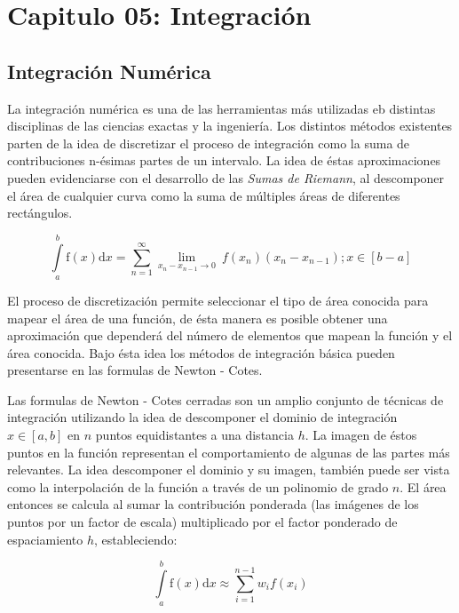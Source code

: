 \documentclass[letterpaper,10pt,oneside]{sphinxmanual}
\theoremstyle{plain}%
\theoremstyle{definition}%
\theoremstyle{remark}%
\begin{document}
\chapter{Capitulo 05: Integración}
\label{chapter05::doc}\label{chapter05:capitulo-05-integración}

\section{Integración Numérica}
\label{chapter05:Integración Numérica}
La integración numérica es una de las herramientas más utilizadas eb distintas disciplinas de las ciencias exactas y la ingeniería. Los distintos métodos existentes parten de la idea de discretizar el proceso de integración como la suma de contribuciones n-ésimas partes de un intervalo. La idea de éstas aproximaciones pueden evidenciarse con el desarrollo de las \textit{Sumas de Riemann}, al descomponer el área de cualquier curva como la suma de múltiples áreas de diferentes rectángulos.

\begin{equation}
\int\limits_{a}^{b} \mathrm{f}(x)\mathrm{d}x = \sum\limits_{n=1}^{\infty} \lim_{x_{n} - x_{n-1}\to 0}\ f(x_{n})(x_{n} - x_{n-1}); x\in[b - a]
\end{equation}

El proceso de discretización permite seleccionar el tipo de área conocida para mapear el área de una función, de ésta manera es posible obtener una aproximación que dependerá del número de elementos que mapean la función y el área conocida. Bajo ésta idea los métodos de integración básica pueden presentarse en las formulas de Newton - Cotes.

Las formulas de Newton - Cotes cerradas son un amplio conjunto de técnicas de integración utilizando la idea de descomponer el dominio de integración $x\in[a, b]$ en $n$ puntos equidistantes a una distancia $h$. La imagen de éstos puntos en la función representan el comportamiento de algunas de las partes más relevantes. La idea descomponer el dominio y su imagen, también puede ser vista como la interpolación de la función a través de un polinomio de grado $n$. El área entonces se calcula al sumar la contribución ponderada (las imágenes de los puntos por un factor de escala) multiplicado por el factor ponderado de espaciamiento $h$, estableciendo:

\begin{equation}
\int\limits_{a}^{b} \mathrm{f}(x)\mathrm{d}x \approx \sum\limits_{i=1}^{n-1} w_{i}f(x_{i})
\end{equation}
\end{document}
